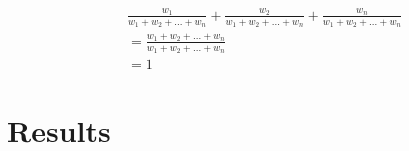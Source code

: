 \documentclass[11pt]{article} %
\begin{document}
\begin{equation}
\begin{split}
&\frac{w_1}{w_1 + w_2 + ... + w_n} + \frac{w_2}{w_1 + w_2 + ... + w_n} + \frac{w_n}{w_1 + w_2 + ... + w_n}\\
&= \frac{w_1 + w_2 + ...  +w_n}{w_1 + w_2 + ... + w_n}\\
&= 1
\end{split}
\end{equation}



\section{Results}


\printbibliography %
\end{document}
